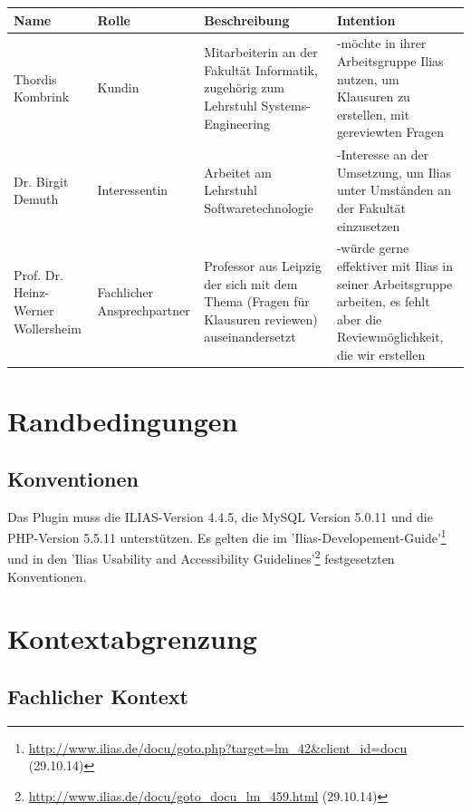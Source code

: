 \documentclass[a4paper]{scrreprt}
\begin{document}
\begin{tabular}{|p{3.5cm}|p{2.3cm}|p{3cm}|p{4cm}|}\hline
Name & Rolle & Beschreibung & Intention \\\hline
Thordis Kombrink & Kundin & Mitarbeiterin an der Fakultät Informatik, zugehörig zum Lehrstuhl Systems-Engineering & -möchte in ihrer Arbeitsgruppe Ilias nutzen, um Klausuren zu erstellen, mit gereviewten Fragen\\\hline
Dr. Birgit Demuth & Interessentin & Arbeitet am Lehrstuhl Softwaretechnologie & -Interesse an der Umsetzung, um Ilias unter Umständen an der Fakultät einzusetzen\\\hline
Prof. Dr. Heinz-Werner Wollersheim & Fachlicher Ansprechpartner & Professor aus Leipzig der sich mit dem Thema (Fragen für Klausuren reviewen) auseinandersetzt & -würde gerne effektiver mit Ilias in seiner Arbeitsgruppe arbeiten, es fehlt aber die Reviewmöglichkeit, die wir erstellen\\\hline
\end{tabular}

\chapter{Randbedingungen}

\section{Konventionen} 

Das Plugin muss die ILIAS-Version 4.4.5, die MySQL Version 5.0.11 und die PHP-Version 5.5.11 unterstützen.
Es gelten die im 'Ilias-Developement-Guide'\footnote{\url{http://www.ilias.de/docu/goto.php?target=lm_42&client_id=docu} (29.10.14)} und in den 'Ilias Usability and Accessibility Guidelines'\footnote{\url{http://www.ilias.de/docu/goto_docu_lm_459.html} (29.10.14)} festgesetzten Konventionen.

\chapter{Kontextabgrenzung}

\section{Fachlicher Kontext}
\end{document}
